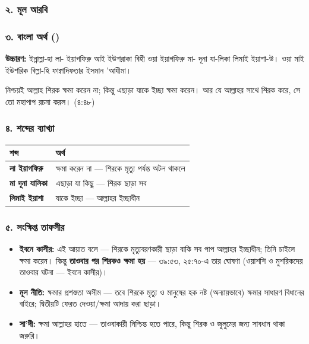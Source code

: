 \subsubsection*{২. মূল আরবি}

\begin{center}\end{center}

\subsubsection*{৩. বাংলা অর্থ ()}

\textbf{উচ্চারণ:} ইন্নাল্লা-হা লা- ইয়াগফিরু আই ইউশরাকা বিহী ওয়া ইয়াগফিরু মা- দূনা যা-লিকা লিমাই ইয়াশা-উ। ওয়া মাই ইউশরিক বিল্লা-হি ফাক্বাদিফতার ইসমান 'আযীমা।

নিশ্চয়ই আল্লাহ শিরক ক্ষমা করেন না; কিন্তু এছাড়া যাকে ইচ্ছা ক্ষমা করেন। আর যে আল্লাহর সাথে শিরক করে, সে তো মহাপাপ রচনা করল। (৪:৪৮)

\subsubsection*{৪. শব্দের ব্যাখ্যা}

\begin{table}[h]\centering\small
\begin{tabular}{ll}
শব্দ & অর্থ \\
\hline
\textbf{লা ইয়াগফিরু} & ক্ষমা করেন না — শিরকে মৃত্যু পর্যন্ত অটল থাকলে \\
\textbf{মা দূনা যালিকা} & এছাড়া যা কিছু — শিরক ছাড়া সব \\
\textbf{লিমাই ইয়াশা} & যাকে ইচ্ছা — আল্লাহর ইচ্ছাধীন \\
\hline
\end{tabular}
\end{table}

\subsubsection*{৫. সংক্ষিপ্ত তাফসীর}

\begin{itemize}
\item \textbf{ইবনে কাসীর:} এই আয়াত বলে — শিরকে মৃত্যুবরণকারী ছাড়া বাকি সব পাপ আল্লাহর ইচ্ছাধীন; তিনি চাইলে ক্ষমা করেন। কিন্তু \textbf{তাওবার পর শিরকও ক্ষমা হয়} — ৩৯:৫৩, ২৫:৭০-এ তার ঘোষণা (ওয়াশশি ও মুশরিকদের তাওবার ঘটনা — ইবনে কাসীর)।
\item \textbf{মূল নীতি:} ক্ষমার প্রশস্ততা অসীম — তবে শিরকে মৃত্যু ও মানুষের হক নষ্ট (অন্যায়ভাবে) ক্ষমার সাধারণ বিধানের বাইরে; দ্বিতীয়টি ফেরত দেওয়া/ক্ষমা আদায় করা ছাড়া।
\item \textbf{সা'দী:} ক্ষমা আল্লাহর হাতে — তাওবাকারী নিশ্চিন্ত হতে পারে, কিন্তু শিরক ও জুলুমের জন্য সাবধান থাকা জরুরি।
\end{itemize}
